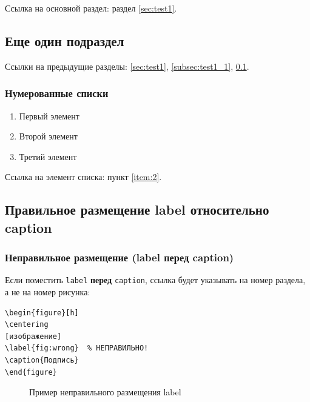 \documentclass[12pt,a4paper]{article}
\begin{document}
Ссылка на основной раздел: раздел \ref{sec:test1}.

\subsection{Еще один подраздел}
\label{subsec:test1_2}

Ссылки на предыдущие разделы: \ref{sec:test1}, \ref{subsec:test1_1}, \ref{subsec:test1_2}.

\subsubsection{Нумерованные списки}

\begin{enumerate}
    \item Первый элемент \label{item:1}
    \item Второй элемент \label{item:2}
    \item Третий элемент \label{item:3}
\end{enumerate}

Ссылка на элемент списка: пункт \ref{item:2}.

\subsection{Правильное размещение label относительно caption}

\subsubsection{Неправильное размещение (label перед caption)}

Если поместить \texttt{label} \textbf{перед} \texttt{caption}, ссылка будет указывать на номер раздела, а не на номер рисунка:

\begin{verbatim}
\begin{figure}[h]
\centering
[изображение]
\label{fig:wrong}  % НЕПРАВИЛЬНО!
\caption{Подпись}
\end{figure}
\end{verbatim}

\begin{figure}[h]
\centering
{}
\label{fig:wrong_order}  %
\caption{Пример неправильного размещения label}
\end{figure}
\end{document}

